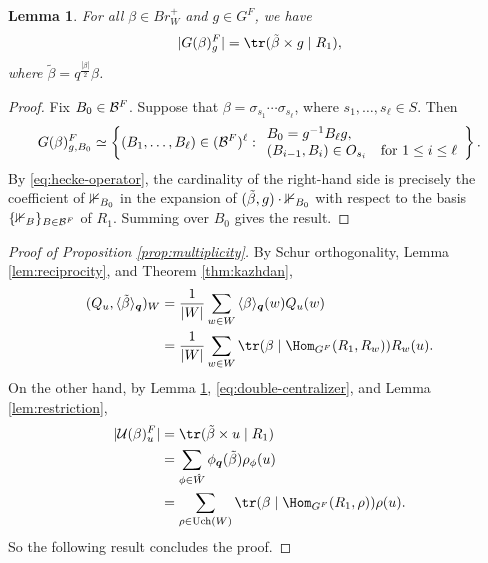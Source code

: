 \documentclass[a4paper,10pt,leqno]{amsart}
\theoremstyle{plain}
\theoremstyle{plain}
\theoremstyle{plain}
\newtheorem{lem}[thm]{Lemma}
\theoremstyle{definition}
\theoremstyle{remark}
\newcommand{\Br}{\mathit{Br}}
\newcommand{\Q}{\bm{q}}
\newcommand{\UCh}{\mathrm{Uch}}
\newcommand{\Tr}[1]{\langle{#1}\rangle_{\Q}}
\begin{document}
\begin{lem}\label{lem:point-count}
For all $\beta \in \Br_W^+$ and $g \in G^F$, we have 
\begin{align}
|G(\beta)_g^F| = \tr(\tilde{\beta} \times g \mid R_1),
\end{align}
where $\tilde{\beta} = q^{\frac{|\beta|}{2}} \beta$.
\end{lem}

\begin{proof}
Fix $B_0 \in \cal{B}^F$.
Suppose that $\beta = \sigma_{s_1} \cdots \sigma_{s_\ell}$, where $s_1, \ldots, s_\ell \in S$.
Then
\begin{align}
G(\beta)_{g, B_0}^F 
\simeq 
\left\{(B_1, \ldots, B_\ell) \in (\cal{B}^F)^\ell : 
\begin{array}{ll}
B_0 = g^{-1} B_\ell g,\\
(B_{i - 1}, B_i) \in O_{s_i} &\text{for $1 \leq i \leq \ell$}
\end{array}
\right\}.
\end{align}
By \eqref{eq:hecke-operator}, the cardinality of the right-hand side is precisely the coefficient of $\bb{1}_{B_0}$ in the expansion of $(\tilde{\beta}, g) \cdot \bb{1}_{B_0}$ with respect to the basis $\{\bb{1}_B\}_{B \in \cal{B}^F}$ of $R_1$.
Summing over $B_0$ gives the result.
\end{proof}

\begin{proof}[Proof of Proposition \ref{prop:multiplicity}]
By Schur orthogonality, Lemma \ref{lem:reciprocity}, and Theorem \ref{thm:kazhdan},
\begin{align}\begin{split}
(Q_u, \Tr{\tilde{\beta}})_W
&=	\frac{1}{|W|} \sum_{w \in W} {\Tr{\beta}(w)} Q_u(w)\\
&=	\frac{1}{|W|} \sum_{w \in W} {\tr(\beta \mid \Hom_{G^F}(R_1, R_w))} R_w(u).
\end{split}\end{align}
On the other hand, by Lemma \ref{lem:point-count}, \eqref{eq:double-centralizer}, and Lemma \ref{lem:restriction},
\begin{align}\begin{split}
|\cal{U}(\beta)_u^F| 
&= 	\tr(\tilde{\beta} \times u \mid R_1)\\
&=	\sum_{\phi \in \hat{W}}
	\phi_{\Q}(\tilde{\beta}) \rho_\phi(u)\\
&=	\sum_{\rho \in \UCh(W)}
	\tr(\beta \mid \Hom_{G^F}(R_1, \rho)) \rho(u).
\end{split}\end{align}
So the following result concludes the proof.
\end{proof}
\end{document}
